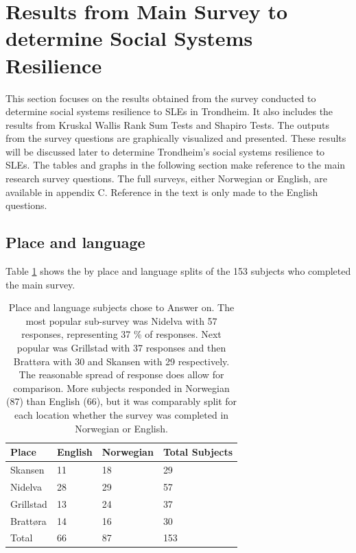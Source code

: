 \paragraph{}






\section{Results from Main Survey to determine Social Systems Resilience}

This section focuses on the results obtained from the survey conducted to determine social systems resilience to SLEs in Trondheim.  It also includes the results from Kruskal Wallis Rank Sum Tests and Shapiro Tests. The outputs from the survey questions are graphically visualized and presented. These results will be discussed later to determine Trondheim's social systems resilience to SLEs. The tables and graphs in the following section make reference to the main research survey questions. The full surveys, either Norwegian or English, are available in appendix C. Reference in the text is only made to the English questions. 



\subsection{Place and language}
Table \ref{tab:place_language} shows the by place and language splits of the 153 subjects who completed the main survey. 
\begin{table}[H]
    \centering
    \begin{tabular}{|l|l|l|l|}
    \hline
    \textbf{Place}  & \textbf{ English} & \textbf{Norwegian} & \textbf{Total Subjects}  \\ \hline
      Skansen & 11 & 18  & 29    \\ \hline
      Nidelva & 28 & 29 & 57      \\ \hline
      Grillstad & 13 & 24 & 37       \\ \hline
      Brattøra & 14 & 16 & 30     \\ \hline
      Total & 66 & 87 & 153   \\ \hline
     \end{tabular}
    \caption{Place and language subjects chose to Answer on. The most popular sub-survey was Nidelva with 57 responses, representing 37 \% of responses. Next popular was Grillstad with 37 responses and then Brattøra with 30 and Skansen with 29 respectively. The reasonable spread of response does allow for comparison. More subjects responded in Norwegian (87) than English (66), but it was comparably split for each location whether the survey was completed in Norwegian or English. }
    \label{tab:place_language}
\end{table}
